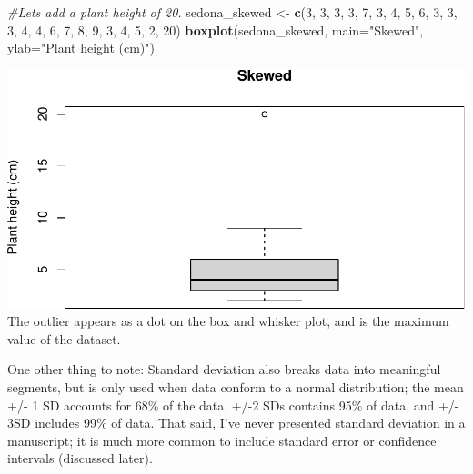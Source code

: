 \documentclass[
]{book}
\newenvironment{Shaded}{\begin{snugshade}}{\end{snugshade}}
\newcommand{\AttributeTok}[1]{\textcolor[rgb]{0.13,0.29,0.53}{#1}}
\newcommand{\CommentTok}[1]{\textcolor[rgb]{0.56,0.35,0.01}{\textit{#1}}}
\newcommand{\DecValTok}[1]{\textcolor[rgb]{0.00,0.00,0.81}{#1}}
\newcommand{\FunctionTok}[1]{\textcolor[rgb]{0.13,0.29,0.53}{\textbf{#1}}}
\newcommand{\NormalTok}[1]{#1}
\newcommand{\OtherTok}[1]{\textcolor[rgb]{0.56,0.35,0.01}{#1}}
\newcommand{\StringTok}[1]{\textcolor[rgb]{0.31,0.60,0.02}{#1}}
\begin{document}
\begin{Shaded}
\begin{Highlighting}[]
\CommentTok{\#Let\textquotesingle{}s add a plant height of 20.}
\NormalTok{sedona\_skewed }\OtherTok{\textless{}{-}} \FunctionTok{c}\NormalTok{(}\DecValTok{3}\NormalTok{, }\DecValTok{3}\NormalTok{, }\DecValTok{3}\NormalTok{, }\DecValTok{3}\NormalTok{, }\DecValTok{7}\NormalTok{, }\DecValTok{3}\NormalTok{, }\DecValTok{4}\NormalTok{, }\DecValTok{5}\NormalTok{, }\DecValTok{6}\NormalTok{, }\DecValTok{3}\NormalTok{, }\DecValTok{3}\NormalTok{, }\DecValTok{3}\NormalTok{, }\DecValTok{4}\NormalTok{, }\DecValTok{4}\NormalTok{, }\DecValTok{6}\NormalTok{, }\DecValTok{7}\NormalTok{, }\DecValTok{8}\NormalTok{, }\DecValTok{9}\NormalTok{, }\DecValTok{3}\NormalTok{, }\DecValTok{4}\NormalTok{, }\DecValTok{5}\NormalTok{, }\DecValTok{2}\NormalTok{, }\DecValTok{20}\NormalTok{)}
\FunctionTok{boxplot}\NormalTok{(sedona\_skewed, }\AttributeTok{main=}\StringTok{"Skewed"}\NormalTok{, }\AttributeTok{ylab=}\StringTok{"Plant height (cm)"}\NormalTok{)}
\end{Highlighting}
\end{Shaded}

\includegraphics{_main_files/figure-latex/unnamed-chunk-14-1.pdf}
The outlier appears as a dot on the box and whisker plot, and is the maximum value of the dataset.

One other thing to note: Standard deviation also breaks data into meaningful segments, but is only used when data conform to a normal distribution; the mean +/- 1 SD accounts for 68\% of the data, +/-2 SDs contains 95\% of data, and +/- 3SD includes 99\% of data. That said, I've never presented standard deviation in a manuscript; it is much more common to include standard error or confidence intervals (discussed later).
\end{document}

